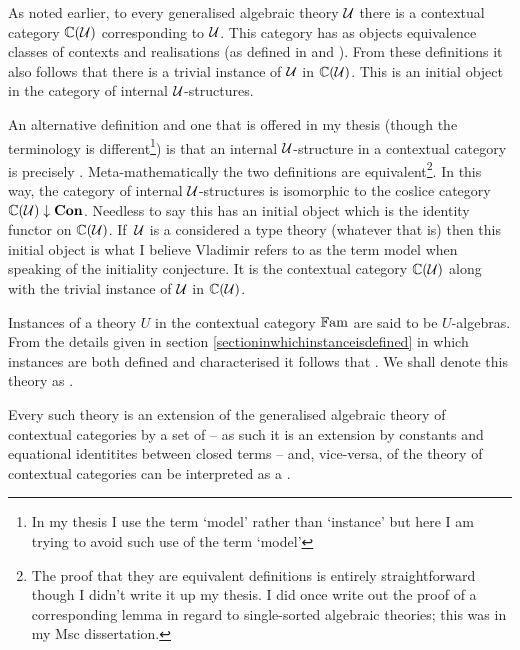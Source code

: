 \documentclass[10pt,a4paper]{article}
\theoremstyle{remark}
\begin{document}
\note 
As  noted earlier, to every generalised algebraic theory $\gat[U]$ there  is a contextual category $\CofU$ corresponding to $\gat[U]$. This category has as objects equivalence classes of contexts and realisations (as defined 
in \cite{Cartmell78} and  \cite{Cartmell86}). 
From these definitions it also follows that there is a trivial instance
of $\gat[U]$ in  $\CofU$. This is an initial object in
the category of internal $\gat[U]$-structures.

\note 
An alternative definition and one that is offered  in my thesis 
(though the terminology is different\footnote{In my thesis I use the term `model' rather than `instance'  but here I am trying to avoid such use of the term `model'}) is that an internal $\gat[U]$-structure in a contextual category \catcw is precisely 
 . 
Meta-mathematically the two definitions are equivalent\footnote{The proof that they are equivalent 
definitions is entirely straightforward though I didn't write it up my thesis. I did once write out the proof of a  corresponding lemma in regard to single-sorted algebraic theories; this was in my Msc dissertation.}.
\note
In this way, the category of internal $\gat[U]$-structures  is isomorphic to the coslice category
$\CofU \downarrow \catCon$. Needless to say this has an initial object which is the identity functor on  $\CofU$.
If\ $\gat[U]$ is a considered a type theory (whatever that is) then this initial object is what I believe Vladimir refers
to as the term model when speaking of the initiality conjecture. It is the contextual category
$\CofU$ along with the trivial instance of $\gat[U]$ in $\CofU$.

\note 
Instances of a theory $U$ in the contextual category $\Fam$ are said to be $U$-algebras. 
\newcommand{\hatU}{\rule{0pt}{12pt}\hat {\gat[U]}}
\note 
From the details given in
section \ref{sectioninwhichinstanceisdefined} 
in which instances are both defined and characterised 
it follows that 
. We shall denote this theory as \highlight{$\hatU$}.

Every such theory \highlight{$\hatU$} is an extension of the generalised algebraic theory of contextual categories
by a set of  -- as such it is an extension
by constants and equational identitites between closed terms -- and, vice-versa,  of
the theory of contextual categories can be interpreted as a .  
\end{document}
